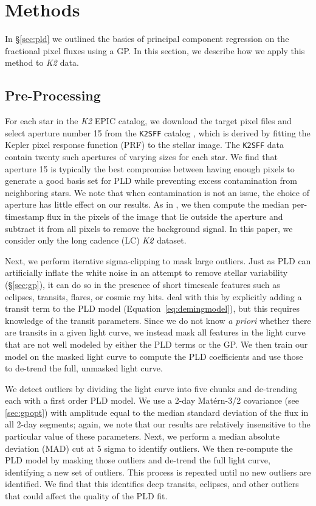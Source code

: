 \documentclass[]{emulateapj}
\begin{document}
\section{Methods}
\label{sec:methods}
In \S\ref{sec:pld} we outlined the basics of principal component regression
on the fractional pixel fluxes using a GP. In this section, we describe how we apply
this method to \emph{K2} data.

\subsection{Pre-Processing}
\label{sec:pre}
For each star in the \emph{K2} EPIC catalog, we download the target pixel files and
select aperture number 15 from the \texttt{K2SFF} catalog \citep{VJ14, VAN14}, which is derived
by fitting the Kepler pixel response function (PRF) to the stellar image. The \texttt{K2SFF}
data contain twenty such apertures of varying sizes for each star. We find that aperture 15
is typically the best compromise between having enough pixels to generate a good basis
set for PLD while preventing excess contamination from neighboring stars. We note that
when contamination is not an issue, the choice of aperture has little effect on our results.
As in \cite{VJ14}, we then compute the median per-timestamp flux in the pixels of the image 
that lie outside the aperture and subtract it from all pixels
to remove the background signal. In this paper, we consider only the long cadence (LC)
$\emph{K2}$ dataset.

Next, we perform iterative sigma-clipping to mask large outliers. Just
as PLD can artificially inflate the white noise in an attempt to remove stellar
variability (\S\ref{sec:gp}), it can do so in the presence of short timescale features
such as eclipses, transits, flares, or cosmic ray hits. \cite{DEM15} deal with this
by explicitly adding a transit term to the PLD model (Equation~\ref{eq:demingmodel}),
but this requires knowledge of the transit parameters. Since we do not
know \emph{a priori} whether there are transits in a given light curve, we instead 
mask all features in the light curve that are not well modeled by either the PLD
terms or the GP. We then train our model on the masked light curve to compute the
PLD coefficients and use those to de-trend the full, unmasked light curve.

We detect outliers by dividing the light curve into five chunks and de-trending each
with a first order PLD model. We use a 2-day Mat\'ern-3/2
covariance (see \ref{sec:gpopt}) with amplitude equal to the median standard deviation
of the flux in all 2-day segments; again, we note that our results are relatively
insensitive to the particular value of these parameters. Next, we perform a
median absolute deviation (MAD) cut at 5 sigma to identify outliers.
We then re-compute the PLD model by masking those outliers and de-trend the full
light curve, identifying a new set of outliers. This process is repeated until no new outliers
are identified. We find that this identifies deep transits, eclipses, and
other outliers that could affect the quality of the PLD fit.
\end{document}
